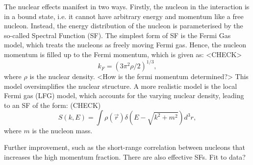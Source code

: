   The nuclear effects manifest in two ways.
  Firstly, the nucleon in the interaction is in a bound state, i.e. it cannot have arbitrary energy and momentum like a free nucleon.
  Instead, the energy distribution of the nucleon is parameterised by the so-called Spectral Function (SF).
  The simplest form of SF is the Fermi Gas model, which treats the nucleons as freely moving Fermi gas.
  Hence, the nucleon momentum is filled up to the Fermi momentum, which is given as:
  <CHECK>
  \begin{equation}
      k_F = (3\pi^2 \rho/2)^{1/3},
  \end{equation}
  where $\rho$ is the nuclear density.
  <How is the fermi momentum determined?>
  This model oversimplifies the nuclear structure.
  A more realistic model is the local Fermi gas (LFG) model, which accounts for the varying nuclear density, leading to an SF of the form:
  (CHECK)
  \begin{equation}
      S(k, E) = \int \rho(\vec{r}) \delta(E - \sqrt{k^2 + m^2}) d^3r,
  \end{equation}
  where $m$ is the nucleon mass.

  Further improvement, such as the short-range correlation between nucleons that increases the high momentum fraction.
  There are also effective SFs. Fit to data?

